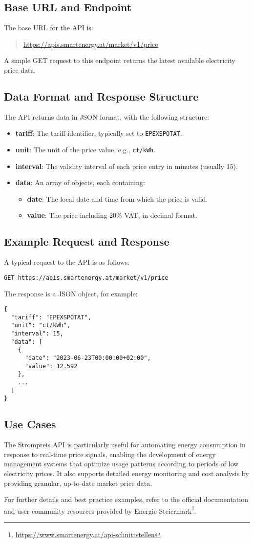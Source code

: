 \subsection{Base URL and Endpoint}
The base URL for the API is:
\begin{quote}
    \url{https://apis.smartenergy.at/market/v1/price}
\end{quote}
A simple GET request to this endpoint returns the latest available electricity price data.

\subsection{Data Format and Response Structure}
The API returns data in JSON format, with the following structure:
\begin{itemize}
    \item \textbf{tariff}: The tariff identifier, typically set to \texttt{EPEXSPOTAT}.
    \item \textbf{unit}: The unit of the price value, e.g., \texttt{ct/kWh}.
    \item \textbf{interval}: The validity interval of each price entry in minutes (usually 15).
    \item \textbf{data}: An array of objects, each containing:
    \begin{itemize}
        \item \textbf{date}: The local date and time from which the price is valid.
        \item \textbf{value}: The price including 20\% VAT, in decimal format.
    \end{itemize}
\end{itemize}

\subsection{Example Request and Response}
A typical request to the API is as follows:
\begin{verbatim}
GET https://apis.smartenergy.at/market/v1/price
\end{verbatim}

The response is a JSON object, for example:
\begin{verbatim}
{
  "tariff": "EPEXSPOTAT",
  "unit": "ct/kWh",
  "interval": 15,
  "data": [
    {
      "date": "2023-06-23T00:00:00+02:00",
      "value": 12.592
    },
    ...
  ]
}
\end{verbatim}

\subsection{Use Cases}
The Strompreis API is particularly useful for automating energy consumption in response to real-time price signals, enabling the development of energy management systems that optimize usage patterns according to periods of low electricity prices. It also supports detailed energy monitoring and cost analysis by providing granular, up-to-date market price data.

For further details and best practice examples, refer to the official documentation and user community resources provided by Energie Steiermark\footnote{\url{https://www.smartenergy.at/api-schnittstellen}}.
